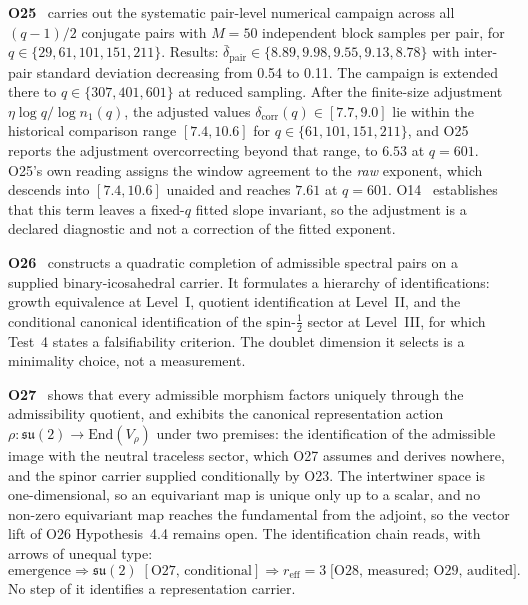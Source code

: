 \documentclass[11pt,a4paper]{article}
\theoremstyle{definition}
\newcommand{\su}{\mathfrak{su}}
\newcommand{\End}{\mathrm{End}}
\begin{document}
      \textbf{O25}~\cite{Beau2026a29} carries out the systematic pair-level numerical campaign
      across all $(q-1)/2$ conjugate pairs with $M = 50$ independent block samples per pair, for
      $q \in \{29, 61, 101, 151, 211\}$.
      Results: $\bar\delta_{\mathrm{pair}} \in \{8.89, 9.98, 9.55, 9.13, 8.78\}$ with inter-pair
      standard deviation decreasing from 0.54 to 0.11.
      The campaign is extended there to $q \in \{307, 401, 601\}$ at reduced sampling.
      After the finite-size adjustment $\eta \log q / \log n_1(q)$, the adjusted values
      $\delta_{\mathrm{corr}}(q) \in [7.7, 9.0]$ lie within the historical comparison range $[7.4, 10.6]$ for
      $q \in \{61, 101, 151, 211\}$, and O25 reports the adjustment overcorrecting beyond that
      range, to $6.53$ at $q = 601$.
      O25's own reading assigns the window agreement to the \emph{raw} exponent, which descends
      into $[7.4, 10.6]$ unaided and reaches $7.61$ at $q = 601$.
      O14~\cite{Beau2026a18} establishes that this term leaves a fixed-$q$ fitted slope invariant,
      so the adjustment is a declared diagnostic and not a correction of the fitted exponent.

      \textbf{O26}~\cite{Beau2026a30} constructs a quadratic completion of admissible spectral
      pairs on a supplied binary-icosahedral carrier.
      It formulates a hierarchy of identifications: growth equivalence at Level~I, quotient
      identification at Level~II, and the conditional canonical identification of the
      spin-$\tfrac{1}{2}$ sector at Level~III, for which Test~4 states a falsifiability criterion.
      The doublet dimension it selects is a minimality choice, not a measurement.

      \textbf{O27}~\cite{Beau2026a31} shows that every admissible morphism factors uniquely
      through the admissibility quotient, and exhibits the canonical representation action
      $\rho \colon \su(2) \to \End(V_\rho)$ under two premises: the identification of the
      admissible image with the neutral traceless sector, which O27 assumes and derives nowhere,
      and the spinor carrier supplied conditionally by O23.
      The intertwiner space is one-dimensional, so an equivariant map is unique only up to a
      scalar, and no non-zero equivariant map reaches the fundamental from the adjoint, so the
      vector lift of O26 Hypothesis~4.4 remains open.
      The identification chain reads, with arrows of unequal type:
      \[
        \text{emergence} \Rightarrow \su(2)\;[\text{O27, conditional}]
        \Rightarrow r_{\mathrm{eff}} = 3\;\text{[O28, measured; O29, audited]}.
      \]
      No step of it identifies a representation carrier.
\end{document}
